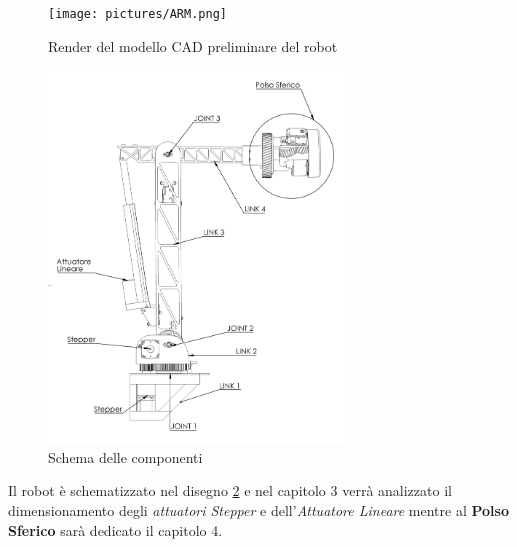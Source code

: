 \documentclass[%
corpo=11pt,
twoside,
 stile=classica,
oldstyle,
greek,%
]{toptesi}
\begin{document}
	\begin{figure}
	\centering
	\texttt{[image: pictures/ARM.png]}
	\caption{Render del modello CAD preliminare del robot}
	\label{fig:render}
\end{figure}
	\begin{figure}
	\centering
	\includegraphics[width=0.7\textwidth]{Screen/ARMBollato.png}
	\caption{Schema delle componenti}
	\label{fig:bollatura}
\end{figure}
Il robot è schematizzato nel disegno \ref{fig:bollatura} e nel capitolo 3 verrà analizzato il dimensionamento degli  \textit{attuatori Stepper} e dell'\textit{Attuatore Lineare} mentre al \textbf{Polso Sferico} sarà dedicato il capitolo 4. 

	
\end{document}
